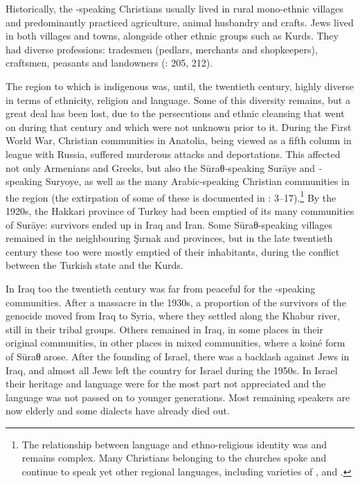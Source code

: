 \documentclass[output=paper]{langsci/langscibook}
\begin{document}
Historically, the -speaking {Christians} usually lived in rural mono-ethnic villages and predominantly practiced agriculture, animal husbandry and crafts. {Jews} lived in both villages and towns, alongside other ethnic groups such as {Kurds}. They had diverse professions: tradesmen (pedlars, merchants and shopkeepers), craftsmen, peasants and landowners (\citealt{BrauerPatai1993}: 205, 212).

The region to which  is indigenous was, until, the twentieth century, highly diverse in terms of ethnicity, religion and language. Some of this diversity remains, but a great deal has been lost, due to the persecutions and ethnic cleansing that went on during that century and which were not unknown prior to it. During the First World War, Christian communities in {Anatolia}, being viewed as a fifth column in league with Russia, suffered murderous attacks and deportations. This affected not only Armenians and Greeks, but also the Sūraθ\textit{{}-}speaking Surāye and \textit{{}-}speaking Suryoye, as well as the many Arabic-speaking Christian communities in the region (the extirpation of some of these is documented in \citealt{Jastrow1978}: 3–17).\footnote{The relationship between language and ethno-religious {identity} was and remains complex. Many {Christians} belonging to the  churches spoke and continue to speak yet other regional languages, including varieties of ,  and .} By the 1920s, the Hakkari province of Turkey had been emptied of its many communities of Surāye: survivors ended up in Iraq and Iran. Some Sūraθ-speaking villages remained in the neighbouring Şırnak and  provinces, but in the late twentieth century these too were mostly emptied of their inhabitants, during the conflict between the Turkish state and the {Kurds}.

In Iraq too the twentieth century was far from peaceful for the -speaking communities. After a massacre in the 1930s, a proportion of the survivors of the genocide moved from Iraq to Syria, where they settled along the Khabur river, still in their tribal groups. Others remained in Iraq, in some places in their original communities, in other places in mixed communities, where a koiné form of Sūraθ arose. After the founding of Israel, there was a backlash against {Jews} in Iraq, and almost all {Jews} left the country for Israel during the 1950s. In Israel their heritage and language were for the most part not appreciated and the language was not passed on to younger generations. Most remaining speakers are now elderly and some dialects have already died out.
\end{document}
